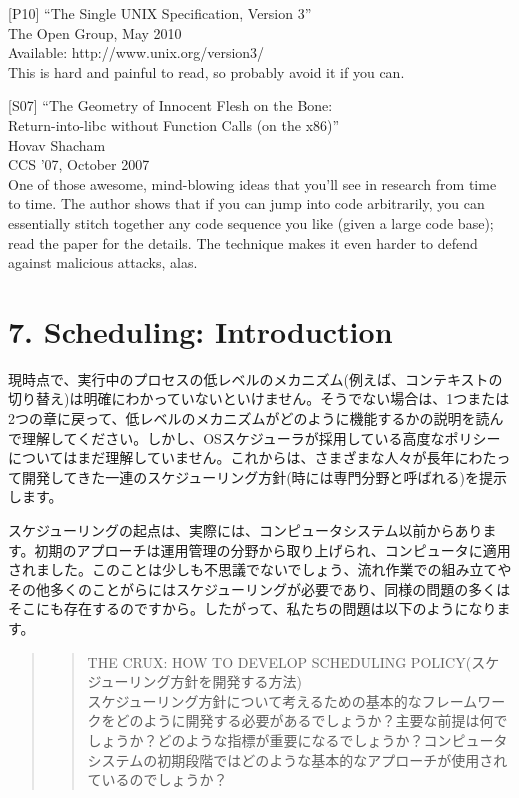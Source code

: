 {[}P10{]} ``The Single UNIX Specification, Version 3''\\
The Open Group, May 2010\\
Available: http://www.unix.org/version3/\\
This is hard and painful to read, so probably avoid it if you can.

{[}S07{]} ``The Geometry of Innocent Flesh on the Bone:\\
Return-into-libc without Function Calls (on the x86)''\\
Hovav Shacham\\
CCS '07, October 2007\\
One of those awesome, mind-blowing ideas that you'll see in research
from time to time. The author shows that if you can jump into code
arbitrarily, you can essentially stitch together any code sequence you
like (given a large code base); read the paper for the details. The
technique makes it even harder to defend against malicious attacks,
alas.

\newpage

\hypertarget{scheduling-introduction}{%
\section*{7. Scheduling: Introduction}\label{scheduling-introduction}}

現時点で、実行中のプロセスの低レベルのメカニズム(例えば、コンテキストの切り替え)は明確にわかっていないといけません。そうでない場合は、1つまたは2つの章に戻って、低レベルのメカニズムがどのように機能するかの説明を読んで理解してください。しかし、OSスケジューラが採用している高度なポリシーについてはまだ理解していません。これからは、さまざまな人々が長年にわたって開発してきた一連のスケジューリング方針(時には専門分野と呼ばれる)を提示します。

スケジューリングの起点は、実際には、コンピュータシステム以前からあります。初期のアプローチは運用管理の分野から取り上げられ、コンピュータに適用されました。このことは少しも不思議でないでしょう、流れ作業での組み立てやその他多くのことがらにはスケジューリングが必要であり、同様の問題の多くはそこにも存在するのですから。したがって、私たちの問題は以下のようになります。

\begin{quote}
\begin{quote}
THE CRUX: HOW TO DEVELOP SCHEDULING
POLICY(スケジューリング方針を開発する方法)\\
スケジューリング方針について考えるための基本的なフレームワークをどのように開発する必要があるでしょうか？主要な前提は何でしょうか？どのような指標が重要になるでしょうか？コンピュータシステムの初期段階ではどのような基本的なアプローチが使用されているのでしょうか？
\end{quote}
\end{quote}

